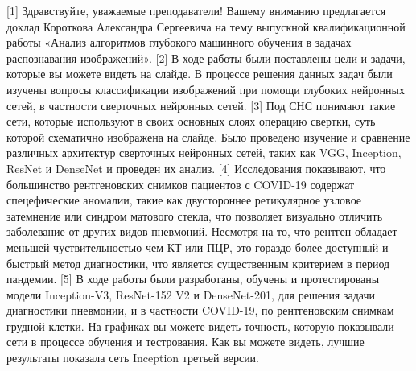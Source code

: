 [1]
Здравствуйте, уважаемые преподаватели!
Вашему вниманию предлагается доклад Короткова Александра Сергеевича на тему выпускной квалификационной работы «Анализ алгоритмов глубокого машинного обучения  в задачах распознавания изображений».
[2]
В ходе работы были поставлены цели и задачи, которые вы можете видеть на слайде.
В процессе решения данных задач были изучены вопросы классификации изображений при помощи глубоких нейронных сетей, в частности сверточных нейронных сетей. 
[3]
Под СНС понимают такие сети, которые используют в своих основных слоях операцию свертки, суть которой схематично изображена на слайде. Было проведено изучение и сравнение различных архитектур сверточных нейронных сетей, таких как VGG, Inception, ResNet и DenseNet и проведен их анализ.   
[4]
Исследования показывают, что большинство рентгеновских снимков пациентов с COVID-19 содержат спецефические аномалии, такие как двустороннее ретикулярное узловое затемнение или синдром матового стекла, что позволяет визуально отличить заболевание от других видов пневмоний. Несмотря на то, что рентген обладает меньшей чуствительностью чем КТ или ПЦР, это гораздо более доступный и быстрый метод диагностики, что является существенным критерием в период пандемии.
[5]
В ходе работы были разработаны, обучены и протестированы модели Inception-V3, ResNet-152 V2 и DenseNet-201, для решения задачи диагностики пневмонии, и в частности COVID-19, по рентгеновским снимкам грудной клетки. На графиках вы можете видеть точность, которую показывали сети в процессе обучения и тестрования. Как вы можете видеть, лучшие результаты показала сеть Inception третьей версии.


